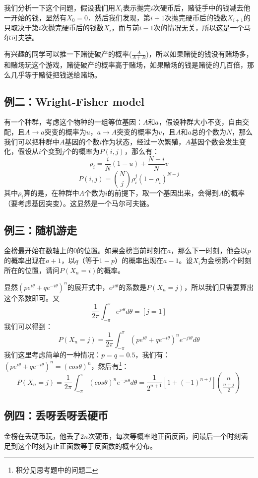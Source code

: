 		我们分析一下这个问题，假设我们用$X_i$表示抛完$i$次硬币后，赌徒手中的钱减去他一开始的钱，显然有$X_0 = 0$．然后我们发现，第$i+1$次抛完硬币后的钱数$X_{i+1}$的只取决于第$i$次抛完硬币后的钱数$X_i$，而与前$i-1$次的情况无关，所以这是一个马尔可夫链。
		
		\remark 有兴趣的同学可以推一下赌徒破产的概率($\frac{A}{A+B}$)，所以如果赌徒的钱没有赌场多，和赌场玩这个游戏，赌徒破产的概率高于赌场，如果赌场的钱是赌徒的几百倍，那么几乎等于赌徒把钱送给赌场。
		
		\subsection{例二：Wright-Fisher model}
		有一个种群，考虑这个物种的一组等位基因：$A$和$a$，假设种群大小不变，自由交配，且$A\rightarrow a$突变的概率为$u$，$a\rightarrow A$突变的概率为$v$，且$A$和$a$总的个数为$N$，那么我们可以把种群中$A$基因的个数$i$作为状态，经过一次繁殖，$A$基因个数会发生变化，假设从$i$个变到$j$个的概率为$P(i,j)$，那么有：
		$$
			\rho_i = \frac{i}{N}(1-u)+\frac{N-i}{N}v
		$$
		$$
			P(i,j) = \binom{N}{j}\rho_i^j(1-\rho_i)^{N-j}
		$$
		其中$\rho_i$算的是，在种群中$A$个数为$i$的前提下，取一个基因出来，会得到$A$的概率（要考虑基因突变）。这显然是一个马尔可夫链。
		
		\subsection{例三：随机游走}
		金榜最开始在数轴上的$0$的位置。如果金榜当前时刻在$a$，那么下一时刻，他会以$p$的概率出现在$a+1$，以$q$（等于$1-p$）的概率出现在$a-1$。设$X_i$为金榜第$i$个时刻所在的位置，请问$P(X_n = i)$的概率。
		
		\proof 显然$(pe^{i\theta}+qe^{-i\theta})^n$的展开式中，$e^{ji\theta}$的系数是$P(X_n=j)$，所以我们只需要算出这个系数即可。又
		$$
		\frac{1}{2\pi}\int_{-\pi}^{\pi}e^{ji\theta}d\theta = [j = 1]
		$$
		我们可以得到：
		$$
			P(X_n=j) = \frac{1}{2\pi}\int_{-\pi}^{\pi}(pe^{i\theta}+qe^{-i\theta})^ne^{-ji\theta}d\theta
		$$
		我们这里考虑简单的一种情况：$p = q = 0.5$，我们有：$(pe^{i\theta}+qe^{-i\theta})^n = (cos\theta)^n$，然后有\footnote{积分见思考题中的问题二}：
		$$
			P(X_n=j) = \frac{1}{2\pi}\int_{-\pi}^{\pi}(cos\theta)^ne^{-ji\theta}d\theta = \frac{1}{2^{n+1}}[1+(-1)^{n+j}]\binom{n}{\frac{n+j}{2}}
		$$
		
		\subsection{例四：丢呀丢呀丢硬币}
		金榜在丢硬币玩，他丢了$2n$次硬币，每次等概率地正面反面，问最后一个时刻满足到这个时刻为止正面数等于反面数的概率分布。
		
